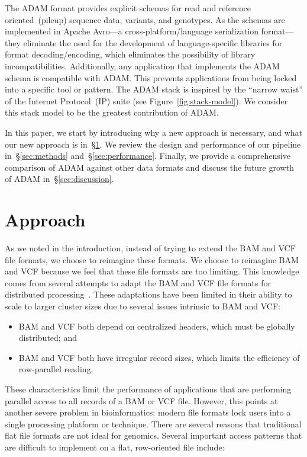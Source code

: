\documentclass{bioinfo}
\begin{document}
The ADAM format provides explicit schemas for read and reference oriented~(pileup) sequence data, variants, and genotypes. As the
schemas are implemented in Apache Avro---a cross-platform/language serialization format---they eliminate
the need for the development of language-specific libraries for format decoding/encoding, which eliminates the possibility of library
incompatibilities. Additionally, any application that implements the ADAM schema is compatible with ADAM. This prevents
applications from being locked into a specific tool or pattern. The ADAM stack is inspired by the ``narrow waist'' of the Internet Protocol~(IP)
suite (see Figure~\ref{fig:stack-model}). We consider this stack model to be the greatest contribution of ADAM.

In this paper, we start by introducing why a new approach is necessary, and what our new approach is in~\S\ref{sec:approach}. We review the
design and performance of our pipeline in~\S\ref{sec:methods} and~\S\ref{sec:performance}. Finally, we provide a comprehensive comparison of
ADAM against other data formats and discuss the future growth of ADAM in~\S\ref{sec:discussion}.

\section{Approach}
\label{sec:approach}

As we noted in the introduction, instead of trying to extend the BAM and VCF file formats, we choose to reimagine these formats. We choose
to reimagine BAM and VCF because we feel that these file formats are too limiting. This knowledge comes from several attempts to adapt the
BAM and VCF file formats for distributed processing~\citep{niemenmaa12}. These adaptations have been limited in their ability to scale to larger
cluster sizes due to several issues intrinsic to BAM and VCF:

\begin{itemize}
\item BAM and VCF both depend on centralized headers, which must be globally distributed; and
\item BAM and VCF both have irregular record sizes, which limits the efficiency of row-parallel reading. 
\end{itemize}

These characteristics limit the performance of applications that are performing parallel access to all records of a BAM or VCF file. However,
this points at another severe problem in bioinformatics: modern file formats lock users into a single processing platform or technique. There are
several reasons that traditional flat file formats are not ideal for genomics. Several important access patterns that are difficult to implement on a flat,
row-oriented file include:
\end{document}
